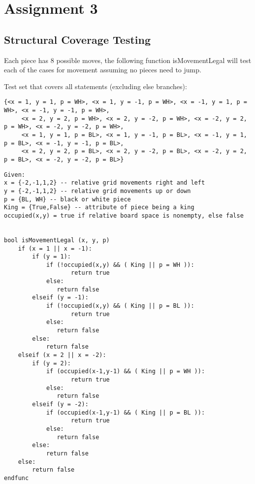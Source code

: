 \documentclass{article}
\begin{document}
\newpage

\section{Assignment 3} \label{a3:s:a3}

\subsection{Structural Coverage Testing}
Each piece has 8 possible moves, the following function isMovementLegal will test each of the cases for movement assuming no pieces need to jump.

Test set that covers all statements (excluding else branches):
    \begin{lstlisting}[numbers=none,basicstyle=\tiny,frame=none]
     {<x = 1, y = 1, p = WH>, <x = 1, y = -1, p = WH>, <x = -1, y = 1, p = WH>, <x = -1, y = -1, p = WH>, 
     <x = 2, y = 2, p = WH>, <x = 2, y = -2, p = WH>, <x = -2, y = 2, p = WH>, <x = -2, y = -2, p = WH>,
     <x = 1, y = 1, p = BL>, <x = 1, y = -1, p = BL>, <x = -1, y = 1, p = BL>, <x = -1, y = -1, p = BL>,
     <x = 2, y = 2, p = BL>, <x = 2, y = -2, p = BL>, <x = -2, y = 2, p = BL>, <x = -2, y = -2, p = BL>}
    \end{lstlisting}
 
\begin{lstlisting}[style=CustomCSharpStyle,numbers=none]
Given:
x = {-2,-1,1,2} -- relative grid movements right and left
y = {-2,-1,1,2} -- relative grid movements up or down
p = {BL, WH} -- black or white piece
King = {True,False} -- attribute of piece being a king
occupied(x,y) = true if relative board space is nonempty, else false


bool isMovementLegal (x, y, p)
    if (x = 1 || x = -1):
        if (y = 1): 
            if (!occupied(x,y) && ( King || p = WH )):
                   return true
            else:
               return false
        elseif (y = -1):
            if (!occupied(x,y) && ( King || p = BL )):
                   return true
            else:
               return false
        else:
            return false
    elseif (x = 2 || x = -2):
        if (y = 2): 
            if (occupied(x-1,y-1) && ( King || p = WH )):
                   return true
            else:
               return false
        elseif (y = -2):
            if (occupied(x-1,y-1) && ( King || p = BL )):
                   return true
            else:
               return false
        else:
            return false
    else:
        return false
endfunc

\end{lstlisting}
\end{document}
